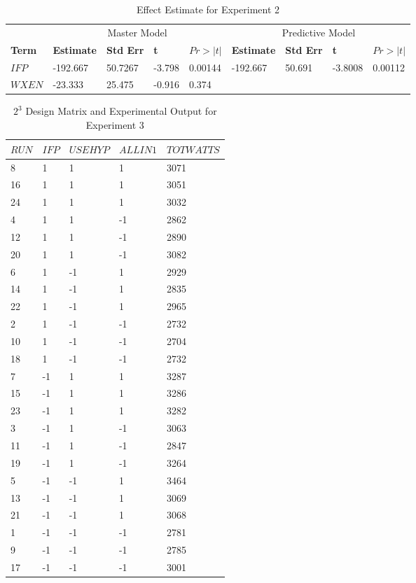 \documentclass[preprint]{sigplanconf}
\begin{document}
\begin{table}
  \centering
  \begin{tabular}{l|llll|llll}
    \multicolumn{1}{c|}{}&\multicolumn{4}{c|}{Master Model}&\multicolumn{4}{c}{Predictive Model}\\
    \bf{Term}&\bf{Estimate}&\bf{Std Err}&\bf{t}&\bf{$Pr>|t|$}&\bf{Estimate}&\bf{Std Err}&\bf{t}&\bf{$Pr>|t|$}\\
    \hline
    $IFP$&-192.667&50.7267&-3.798&0.00144&-192.667&50.691&-3.8008&0.00112\\
    $WXEN$&-23.333&25.475&-0.916&0.374&&&&\\
  \end{tabular}
  \caption{Effect Estimate for Experiment 2}
  \label{tab:EffectEstimates2}
\end{table}
\clearpage
\begin{table}
  \centering
  \begin{tabular}{l|l|l|l|l}
    $RUN$&$IFP$&$USEHYP$&$ALLIN1$&$TOTWATTS$ \\
    \hline
    8&1&1&1&3071\\
    16&1&1&1&3051\\
    24&1&1&1&3032\\
    4&1&1&-1&2862\\
    12&1&1&-1&2890\\
    20&1&1&-1&3082\\
    6&1&-1&1&2929\\
    14&1&-1&1&2835\\
    22&1&-1&1&2965\\
    2&1&-1&-1&2732\\
    10&1&-1&-1&2704\\
    18&1&-1&-1& 2732\\
    7&-1&1&1&3287\\
    15&-1&1&1&3286\\
    23&-1&1&1&3282\\
    3&-1&1&-1&3063\\
    11&-1&1&-1&2847\\
    19&-1&1&-1&3264\\
    5&-1&-1&1&3464\\
    13&-1&-1&1&3069\\
    21&-1&-1&1&3068\\
    1&-1&-1&-1&2781\\
    9&-1&-1&-1&2785\\
    17&-1&-1&-1&3001\\
  \end{tabular}
  \caption{\(2^{3}\) Design Matrix and Experimental Output for Experiment 3}
  \label{tab:ExperimentDesign3}
\end{table}
\end{document}

